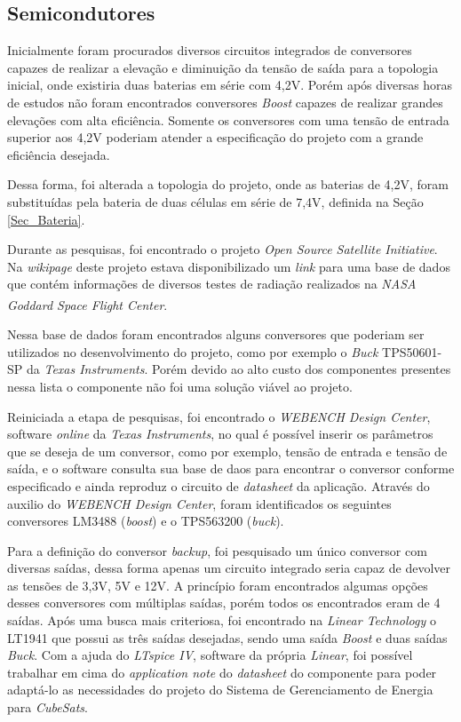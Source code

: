 \documentclass[
	12pt,				%
	openright,			%
	oneside,			%
	a4paper,			%
	english,			%
	french,				%
	spanish,			%
	brazil,				%
	oldfontcommands
	]{abntex2}
\begin{document}
\subsection[Semicondutores]{Semicondutores}

	Inicialmente foram procurados diversos circuitos integrados de conversores capazes de realizar a elevação e diminuição da tensão de saída para a topologia inicial, onde existiria duas baterias em série com 4,2V. Porém após diversas horas de estudos não foram encontrados conversores \textit{Boost} capazes de realizar grandes elevações com alta eficiência. Somente os conversores com uma tensão de entrada superior aos 4,2V poderiam atender a especificação do projeto com a grande eficiência desejada.
	
	Dessa forma, foi alterada a topologia do projeto, onde as baterias de 4,2V, foram substituídas pela bateria de duas células em série de 7,4V, definida na Seção \ref{Sec_Bateria}.
	
	Durante as pesquisas, foi encontrado o projeto \textit{Open Source Satellite Initiative}. Na \textit{wikipage} deste projeto estava disponibilizado um \textit{link} para uma base de dados que contém informações de diversos testes de radiação realizados na \textit{NASA Goddard Space Flight Center}.\textsuperscript{\cite{OSSI}}\textsuperscript{\cite{OSSI2}}\textsuperscript{\cite{OSSI3}}
	
	Nessa base de dados foram encontrados alguns conversores que poderiam ser utilizados no desenvolvimento do projeto, como por exemplo o \textit{Buck} TPS50601-SP da \textit{Texas Instruments}. Porém devido ao alto custo dos componentes presentes nessa lista o componente não foi uma solução viável ao projeto.
	
	Reiniciada a etapa de pesquisas, foi encontrado o \textit{WEBENCH Design Center}, software \textit{online} da \textit{Texas Instruments}, no qual é possível inserir os parâmetros que se deseja de um conversor, como por exemplo, tensão de entrada e tensão de saída, e o software consulta sua base de daos para encontrar o conversor conforme especificado e ainda reproduz o circuito de \textit{datasheet} da aplicação. Através do auxilio do \textit{WEBENCH Design Center}, foram identificados os seguintes conversores LM3488 (\textit{boost}) e o TPS563200 (\textit{buck}).
	
	Para a definição do conversor \textit{backup}, foi pesquisado um único conversor com diversas saídas, dessa forma apenas um circuito integrado seria capaz de devolver as tensões de 3,3V, 5V e 12V. A princípio foram encontrados algumas opções desses conversores com múltiplas saídas, porém todos os encontrados eram de 4 saídas. Após uma busca mais criteriosa, foi encontrado na \textit{Linear Technology} o LT1941 que possui as três saídas desejadas, sendo uma saída \textit{Boost} e duas saídas \textit{Buck}. Com a ajuda do \textit{LTspice IV}, software da própria \textit{Linear}, foi possível trabalhar em cima do \textit{application note} do \textit{datasheet} do componente para poder adaptá-lo as necessidades do projeto do Sistema de Gerenciamento de Energia para \textit{CubeSats}.
\end{document}
